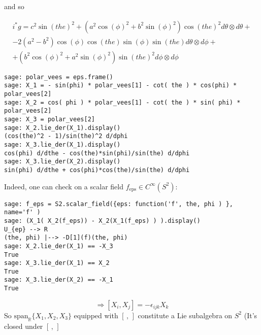 and so

\[
\boxed{ \begin{gathered}
 i^* g = c^{2} \sin\left(\mathit{the}\right)^{2} + {\left(a^{2} \cos\left(\phi\right)^{2} + b^{2} \sin\left(\phi\right)^{2}\right)} \cos\left(\mathit{the}\right)^{2} d\theta \otimes d\theta + \\
-2 {\left(a^{2} - b^{2}\right)} \cos\left(\phi\right) \cos\left(\mathit{the}\right) \sin\left(\phi\right) \sin\left(\mathit{the}\right) d\theta \otimes d\phi +  \\
 + {\left(b^{2} \cos\left(\phi\right)^{2} + a^{2} \sin\left(\phi\right)^{2}\right)} \sin\left(\mathit{the}\right)^{2} d\phi \otimes d\phi 
\end{gathered} }
\]

\questionhead{}

{\small
\begin{verbatim}
sage: polar_vees = eps.frame()
sage: X_1 = - sin(phi) * polar_vees[1] - cot( the ) * cos(phi) * polar_vees[2]
sage: X_2 = cos( phi ) * polar_vees[1] - cot( the ) * sin( phi) * polar_vees[2]
sage: X_3 = polar_vees[2]
sage: X_2.lie_der(X_1).display()
(cos(the)^2 - 1)/sin(the)^2 d/dphi
sage: X_3.lie_der(X_1).display()
cos(phi) d/dthe - cos(the)*sin(phi)/sin(the) d/dphi
sage: X_3.lie_der(X_2).display()
sin(phi) d/dthe + cos(phi)*cos(the)/sin(the) d/dphi
\end{verbatim}
}

Indeed, one can check on a scalar field $f_{\text{eps}} \in C^{\infty}(S^2)$:
{\small
\begin{verbatim}
sage: f_eps = S2.scalar_field({eps: function('f', the, phi ) }, name='f' )
sage: (X_1( X_2(f_eps)) - X_2(X_1(f_eps) ) ).display()
U_{ep} --> R
(the, phi) |--> -D[1](f)(the, phi)
sage: X_2.lie_der(X_1) == -X_3
True
sage: X_3.lie_der(X_1) == X_2
True
sage: X_3.lie_der(X_2) == -X_1
True
\end{verbatim}
}

\[
\Longrightarrow \boxed{ [X_i, X_j] = -\epsilon_{ijk}X_k }
\]
So $\text{span}_{\mathbb{R}} \lbrace X_1,X_2,X_3 \rbrace$ equipped with $[ \, , \, ]$ constitute a Lie subalgebra on $S^2$ (It's closed under $[ \, , \, ]$

